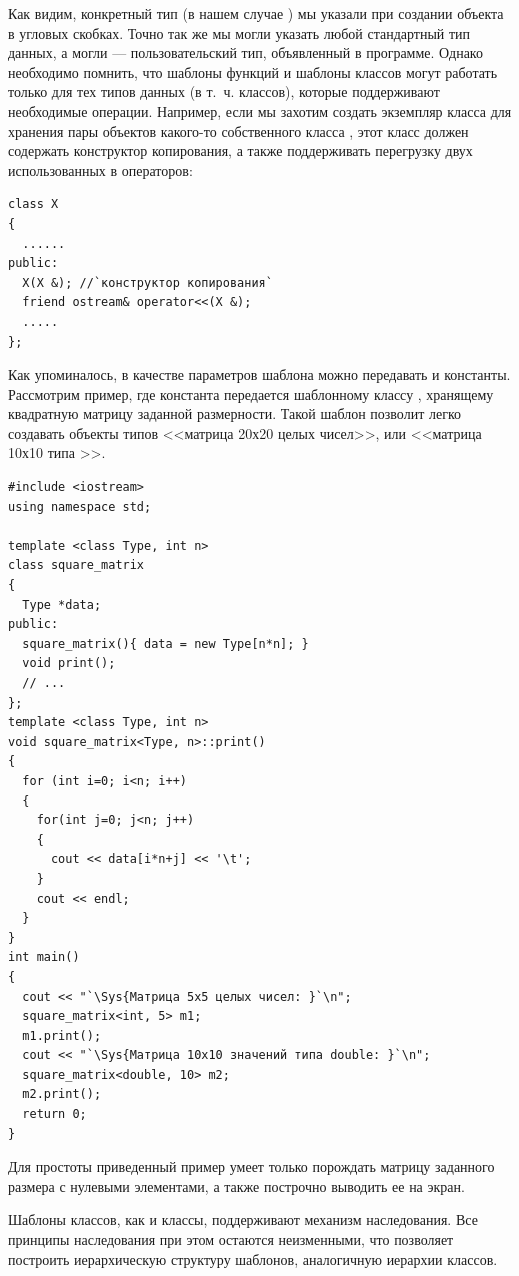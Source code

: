 Как видим, конкретный тип (в нашем случае ) мы указали при создании объекта в угловых
скобках. Точно так же мы могли указать любой стандартный тип данных, а могли --- пользовательский тип, объявленный в
программе. Однако необходимо помнить, что шаблоны функций и шаблоны классов могут работать только для тех типов данных
(в т.~ч. классов), которые поддерживают необходимые операции. Например, если мы захотим создать экземпляр класса
 для хранения пары объектов какого-то собственного класса , этот
класс должен содержать конструктор копирования, а также поддерживать перегрузку двух использованных в
 операторов:
\begin{lstlisting}
class X 
{
  ......
public:
  X(X &); //`конструктор копирования`
  friend ostream& operator<<(X &);
  .....
};
\end{lstlisting}

Как упоминалось, в качестве параметров шаблона можно передавать и константы. Рассмотрим пример, где константа передается
шаблонному классу , хранящему квадратную матрицу заданной размерности. Такой шаблон
позволит легко создавать объекты типов <<матрица 20х20 целых чисел>>, или <<матрица 10х10 типа
>>.
\begin{lstlisting}
#include <iostream> 
using namespace std; 

template <class Type, int n> 
class square_matrix 
{ 
  Type *data; 
public: 
  square_matrix(){ data = new Type[n*n]; } 
  void print(); 
  // ... 
}; 
template <class Type, int n> 
void square_matrix<Type, n>::print() 
{ 
  for (int i=0; i<n; i++) 
  { 
    for(int j=0; j<n; j++) 
    { 
      cout << data[i*n+j] << '\t'; 
    } 
    cout << endl; 
  } 
} 
int main() 
{ 
  cout << "`\Sys{Матрица 5х5 целых чисел: }`\n"; 
  square_matrix<int, 5> m1; 
  m1.print(); 
  cout << "`\Sys{Матрица 10х10 значений типа double: }`\n"; 
  square_matrix<double, 10> m2; 
  m2.print(); 
  return 0; 
} 
\end{lstlisting}

Для простоты приведенный пример умеет только порождать матрицу заданного размера с нулевыми элементами, а также
построчно выводить ее на экран.

Шаблоны классов, как и классы, поддерживают механизм наследования. Все принципы наследования при этом остаются
неизменными, что позволяет построить иерархическую структуру шаблонов, аналогичную иерархии классов.

